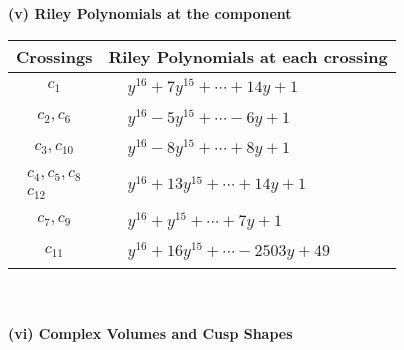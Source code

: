 \documentclass[1p]{elsarticle_modified}
\theoremstyle{definition}
\begin{document}
\newpage\renewcommand{\arraystretch}{1}
\flushleft \textbf{(v) Riley Polynomials at the component}\newline \\
\begin{tabular}{m{50pt}|m{274pt}}
Crossings & \hspace{64pt}Riley Polynomials at each crossing \\
\hline $$\begin{aligned}c_{1}\end{aligned}$$&$\begin{aligned}
&y^{16}+7 y^{15}+\cdots+14 y+1
\end{aligned}$\\
\hline $$\begin{aligned}c_{2},c_{6}\end{aligned}$$&$\begin{aligned}
&y^{16}-5 y^{15}+\cdots-6 y+1
\end{aligned}$\\
\hline $$\begin{aligned}c_{3},c_{10}\end{aligned}$$&$\begin{aligned}
&y^{16}-8 y^{15}+\cdots+8 y+1
\end{aligned}$\\
\hline $$\begin{aligned}c_{4},c_{5},c_{8}\\c_{12}\end{aligned}$$&$\begin{aligned}
&y^{16}+13 y^{15}+\cdots+14 y+1
\end{aligned}$\\
\hline $$\begin{aligned}c_{7},c_{9}\end{aligned}$$&$\begin{aligned}
&y^{16}+y^{15}+\cdots+7 y+1
\end{aligned}$\\
\hline $$\begin{aligned}c_{11}\end{aligned}$$&$\begin{aligned}
&y^{16}+16 y^{15}+\cdots-2503 y+49
\end{aligned}$\\
\hline
\end{tabular}\\~\\
\newpage\flushleft \textbf{(vi) Complex Volumes and Cusp Shapes}
\end{document}
